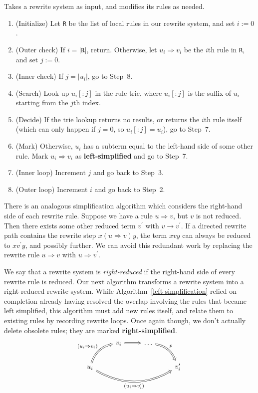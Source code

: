\documentclass[../generics]{subfiles}
\begin{document}
\begin{algorithm}\label{left simplification}
Takes a rewrite system as input, and modifies its rules as needed.
\begin{enumerate}
\item (Initialize) Let \texttt{R} be the list of local rules in our rewrite system, and set $i:=0$.
\item (Outer check) If $i=|\texttt{R}|$, return. Otherwise, let $u_i\Rightarrow v_i$ be the $i$th rule in \texttt{R}, and set $j:=0$.
\item (Inner check) If $j=|u_i|$, go to Step~8.
\item (Search) Look up $u_i[:j]$ in the rule trie, where $u_i[:j]$ is the suffix of $u_i$ starting from the $j$th index.
\item (Decide) If the trie lookup returns no results, or returns the $i$th rule itself (which can only happen if $j=0$, so $u_i[:j]=u_i$), go to Step~7.
\item (Mark) Otherwise, $u_i$ has a subterm equal to the left-hand side of some other rule. Mark $u_i\Rightarrow v_i$ as \textbf{left-simplified} and go to Step~7.
\item (Inner loop) Increment $j$ and go back to Step~3.
\item (Outer loop) Increment $i$ and go back to Step~2.
\end{enumerate}
\end{algorithm}

There is an analogous simplification algorithm which considers the right-hand side of each rewrite rule. Suppose we have a rule $u\Rightarrow v$, but $v$ is not reduced. Then there exists some other reduced term $v^\prime$ with $v\rightarrow v^\prime$. If a directed rewrite path contains the rewrite step $x(u\Rightarrow v)y$, the term $xvy$ can always be reduced to $xv^\prime y$, and possibly further. We can avoid this redundant work by replacing the rewrite rule $u\Rightarrow v$ with $u\Rightarrow v^\prime$.

We say that a rewrite system is \emph{right-reduced} if the right-hand side of every rewrite rule is reduced. Our next algorithm transforms a rewrite system into a right-reduced rewrite system. While Algorithm~\ref{left simplification} relied on completion already having resolved the overlap involving the rules that became left simplified, this algorithm must add new rules itself, and relate them to existing rules by recording rewrite loops. Once again though, we don't actually delete obsolete rules; they are marked \textbf{right-simplified}.
\[
\begin{tikzcd}
&v_i\arrow[r, Rightarrow]&\ldots\arrow[rd, Rightarrow, bend left, "p"]&\\
u_i\arrow[ru, Rightarrow, bend left, "(u_i\Rightarrow v_i)"]\arrow[rrr, Rightarrow, bend right, "(u_i\Rightarrow v_i^\prime)"']&&&v_i^\prime
\end{tikzcd}
\]
\end{document}
